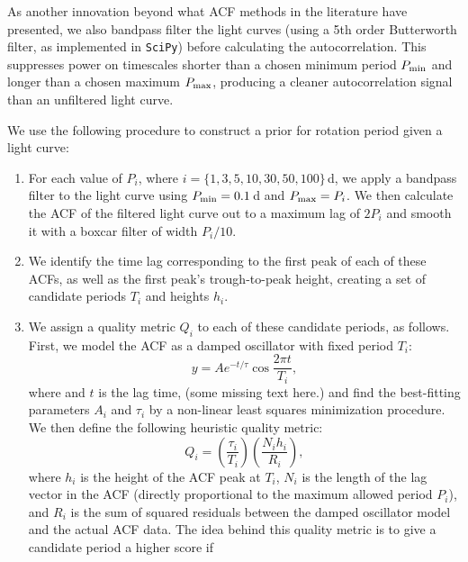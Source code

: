 \documentclass[useAMS, usenatbib, preprint, 12pt]{aastex}
\newcommand{\racomment}[1]{{\color{green}#1}}
\begin{document}
As another innovation beyond what ACF methods in the literature have
presented, we also bandpass filter the light curves (using a 5th order
Butterworth filter, as implemented in \texttt{SciPy}) before calculating the
autocorrelation.  This suppresses power on timescales shorter than a chosen
minimum period $P_{\rm min}$ and longer than a chosen maximum $P_{\rm max}$,
producing a cleaner autocorrelation signal than an unfiltered light curve.

We use the following procedure to construct a prior for rotation period
given a light curve:

\begin{enumerate}
\item{For each value of $P_i$, where $i = \{1, 3, 5, 10, 30, 50, 100\}$\,d,
we apply a bandpass filter to the light curve using $P_{\rm min}=0.1$\,d
and $P_{\rm max} = P_i$.  We then calculate the ACF of the filtered
light curve out to a maximum lag of $2P_i$ and smooth it with a boxcar
filter of width $P_i/10$.}

\item{We identify the time lag corresponding to the
first peak of each of these ACFs, as well as the first peak's
trough-to-peak height, creating a set of candidate periods
$T_i$ and heights $h_i$.}

\item{We assign a quality metric $Q_i$ to each of these candidate
periods, as follows.  First, we model the ACF as a
damped oscillator with fixed period $T_i$:
\begin{equation}
y = A e^{-t/\tau} \cos{\frac{2\pi t}{T_i} },
\end{equation}
        \racomment{where and $t$ is the lag time, (some missing text here.)}
and find the best-fitting parameters $A_i$ and $\tau_i$ by a non-linear
least squares minimization procedure.  We then define the
following heuristic quality metric:
\begin{equation}
\label{eq:quality}
Q_i = \left(\frac{\tau_i}{T_i}\right) \left(\frac{N_i h_i}{R_i}\right),
\end{equation}
where $h_i$ is the height of the ACF peak at $T_i$,
$N_i$ is the length of the lag vector in the ACF (directly proportional
to the maximum allowed period $P_i$),
and $R_i$ is the sum of squared residuals between the
damped oscillator model and the actual ACF data.  The idea behind this
quality metric is to give a candidate period a higher score if

    \begin{enumerate}[(a)]


\end{enumerate}}
\end{enumerate}
\end{document}
